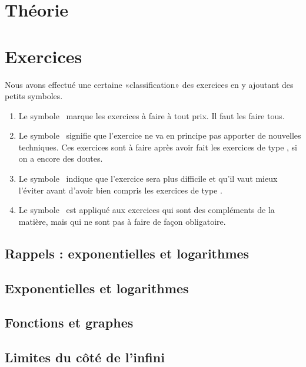 



\chapter{Théorie}


\chapter{Exercices}

Nous avons effectué une certaine «classification» des exercices en y ajoutant des petits symboles.
\begin{enumerate}
	\item Le symbole \minsyndical\ marque les exercices à faire à tout prix. Il faut les faire tous.
	\item Le symbole \boringexo\ signifie que l'exercice ne va en principe pas apporter de nouvelles techniques. Ces exercices sont à faire après avoir fait les exercices de type \minsyndical, si on a encore des doutes.
	\item Le symbole \coolexo\ indique que l'exercice sera plus difficile et qu'il vaut mieux l'éviter avant d'avoir bien compris les exercices de type \minsyndical.
	\item Le symbole \mortelexo\ est appliqué aux exercices qui sont des compléments de la matière, mais qui ne sont pas à faire de façon obligatoire.
\end{enumerate}

\section{Rappels : exponentielles et logarithmes}



\section{Exponentielles et logarithmes}



\section{Fonctions et graphes}



\section{Limites du côté de l'infini}


